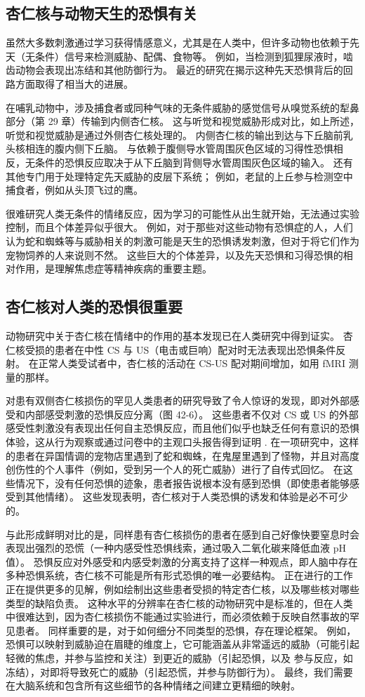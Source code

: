 \subsection{杏仁核与动物天生的恐惧有关}
虽然大多数刺激通过学习获得情感意义，尤其是在人类中，但许多动物也依赖于先天（无条件）信号来检测威胁、配偶、食物等。 例如，当检测到狐狸尿液时，啮齿动物会表现出冻结和其他防御行为。 最近的研究在揭示这种先天恐惧背后的回路方面取得了相当大的进展。

在哺乳动物中，涉及捕食者或同种气味的无条件威胁的感觉信号从嗅觉系统的犁鼻部分（第 29 章）传输到内侧杏仁核。 这与听觉和视觉威胁形成对比，如上所述，听觉和视觉威胁是通过外侧杏仁核处理的。 内侧杏仁核的输出到达与下丘脑前乳头核相连的腹内侧下丘脑。 与依赖于腹侧导水管周围灰色区域的习得性恐惧相反，无条件的恐惧反应取决于从下丘脑到背侧导水管周围灰色区域的输入。 还有其他专门用于处理特定先天威胁的皮层下系统； 例如，老鼠的上丘参与检测空中捕食者，例如从头顶飞过的鹰。

很难研究人类无条件的情绪反应，因为学习的可能性从出生就开始，无法通过实验控制，而且个体差异似乎很大。 例如，对于那些对这些动物有恐惧症的人，人们认为蛇和蜘蛛等与威胁相关的刺激可能是天生的恐惧诱发刺激，但对于将它们作为宠物饲养的人来说则不然。 这些巨大的个体差异，以及先天恐惧和习得恐惧的相对作用，是理解焦虑症等精神疾病的重要主题。

\subsection{杏仁核对人类的恐惧很重要}
动物研究中关于杏仁核在情绪中的作用的基本发现已在人类研究中得到证实。 杏仁核受损的患者在中性 CS 与 US（电击或巨响）配对时无法表现出恐惧条件反射。 在正常人类受试者中，杏仁核的活动在 CS-US 配对期间增加，如用 fMRI 测量的那样。

对患有双侧杏仁核损伤的罕见人类患者的研究导致了令人惊讶的发现，即对外部感受和内部感受刺激的恐惧反应分离（图 42-6）。 这些患者不仅对 CS 或 US 的外部感受性刺激没有表现出任何自主恐惧反应，而且他们似乎也缺乏任何有意识的恐惧体验，这从行为观察或通过问卷中的主观口头报告得到证明 . 在一项研究中，这样的患者在异国情调的宠物店里遇到了蛇和蜘蛛，在鬼屋里遇到了怪物，并且对高度创伤性的个人事件（例如，受到另一个人的死亡威胁）进行了自传式回忆。 在这些情况下，没有任何恐惧的迹象，患者报告说根本没有感到恐惧（即使患者能够感受到其他情绪）。 这些发现表明，杏仁核对于人类恐惧的诱发和体验是必不可少的。

与此形成鲜明对比的是，同样患有杏仁核损伤的患者在感到自己好像快要窒息时会表现出强烈的恐慌（一种内感受性恐惧线索，通过吸入二氧化碳来降低血液 pH 值）。 恐惧反应对外感受和内感受刺激的分离支持了这样一种观点，即人脑中存在多种恐惧系统，杏仁核不可能是所有形式恐惧的唯一必要结构。 正在进行的工作正在提供更多的见解，例如绘制出这些患者受损的特定杏仁核，以及哪些核对哪些类型的缺陷负责。 这种水平的分辨率在杏仁核的动物研究中是标准的，但在人类中很难达到，因为杏仁核损伤不能通过实验进行，而必须依赖于反映自然事故的罕见患者。 同样重要的是，对于如何细分不同类型的恐惧，存在理论框架。 例如，恐惧可以映射到威胁迫在眉睫的维度上，它可能涵盖从非常遥远的威胁（可能引起轻微的焦虑，并参与监控和关注）到更近的威胁（引起恐惧，以及 参与反应，如冻结），对即将导致死亡的威胁（引起恐慌，并参与防御行为）。 最终，我们需要在大脑系统和包含所有这些细节的各种情绪之间建立更精细的映射。

